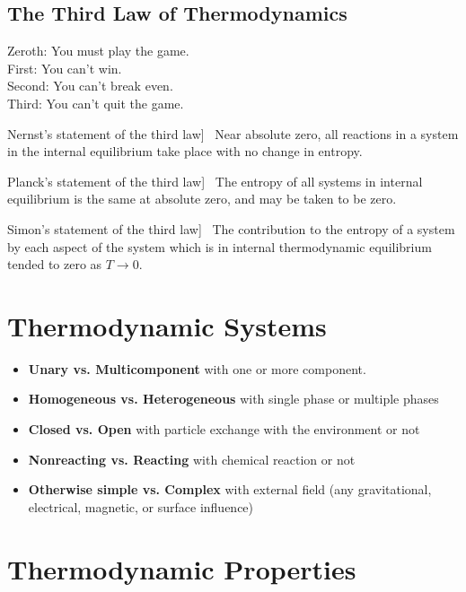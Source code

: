 \documentclass[UTF8]{book}
\newenvironment{theorem}[2][Theorem]{\begin{trivlist}
\item[\hskip \labelsep {\bfseries #1}\hskip \labelsep {\bfseries }]}{\end{trivlist}}
\begin{document}
\subsection{The Third Law of Thermodynamics}
\epigraph{Zeroth: You must play the game.\\
First: You can't win.\\
Second: You can't break even.\\
Third: You can't quit the game.}{}
\begin{theorem}
[Nernst's statement of the third law]~  {Near absolute zero, all reactions in a system in the internal equilibrium take place with no change in entropy.}
\end{theorem}

\begin{theorem}
[Planck's statement of the third law]~  {The entropy of all systems in internal equilibrium is the same at absolute zero, and may be taken to be zero.}
\end{theorem}

\begin{theorem}
[Simon's statement of the third law]~  {The contribution to the entropy of a system by each aspect of the system which is in internal thermodynamic equilibrium tended to zero as $T \rightarrow 0$.}
\end{theorem}

\section{Thermodynamic Systems}
\begin{itemize}
\item{ {\textbf{Unary vs. Multicomponent}}}
 { with one or more component.}
\item{ {\textbf{Homogeneous vs. Heterogeneous}}}
 { with single phase or multiple phases}
\item{ {\textbf{Closed vs. Open}}}
 { with particle exchange with the environment or not}
\item{ {\textbf{Nonreacting vs. Reacting}}}
 { with chemical reaction or not}
\item{ {\textbf{Otherwise simple vs. Complex}}}
 { with external field (any gravitational, electrical, magnetic, or surface influence)}
\end{itemize}

\section{Thermodynamic Properties}
\end{document}

